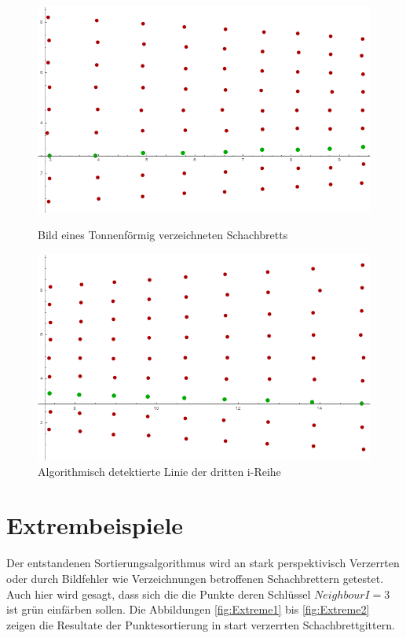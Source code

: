 \begin{figure}[!htb]
	\includegraphics[width=\linewidth]{images/ChessBoardLeftAlg.png}
	\caption{Bild eines Tonnenförmig verzeichneten Schachbretts}
	\label{fig:ChessBoardLeftAlg}
	\endminipage\hfill
	\includegraphics[width=\linewidth]{images/ChessBoardRightAlg.png}
	\caption{Algorithmisch detektierte Linie der dritten i-Reihe}
	\label{fig:ChessBoardRightAlg}
	\endminipage\hfill
\end{figure}


\section{Extrembeispiele}
\label{sec:SchachAlgBeispiele}

Der entstandenen Sortierungsalgorithmus wird an stark perspektivisch Verzerrten oder durch Bildfehler wie Verzeichnungen betroffenen Schachbrettern getestet. Auch hier wird gesagt, dass sich die die Punkte deren Schlüssel $NeighbourI = 3$ ist grün einfärben sollen. Die Abbildungen \ref{fig:Extreme1} bis \ref{fig:Extreme2} zeigen die Resultate der Punktesortierung in start verzerrten Schachbrettgittern.


